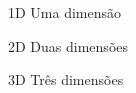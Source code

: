 \begin{siglas}
	\item[1D] Uma dimensão
	\item[2D] Duas dimensões
	\item[3D] Três dimensões
\end{siglas}